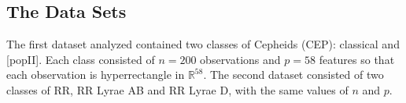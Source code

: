 \documentclass[11pt]{article}
\begin{document}









\subsection{The Data Sets}
The first dataset analyzed contained two classes of Cepheids (CEP):  classical and [popII].  Each class consisted of $n=200$ observations and $p=58$ features so that each observation is hyperrectangle in $\mathbb{R}^{58}$. The second dataset consisted of two classes of RR,  RR Lyrae AB and RR Lyrae D, with the same values of $n$ and $p$.
\end{document}
